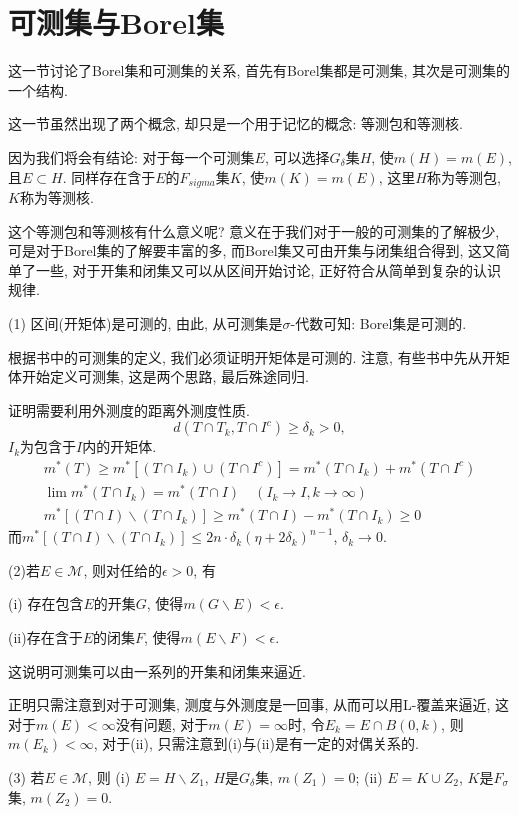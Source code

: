 \documentclass[12pt,a4paper,openany]{book}
\begin{document}
\section{可测集与Borel集}
这一节讨论了Borel集和可测集的关系, 首先有Borel集都是可测集, 其次是可测集的一个结构.

这一节虽然出现了两个概念, 却只是一个用于记忆的概念: 等测包和等测核.

因为我们将会有结论: 对于每一个可测集$E$, 可以选择$G_{\delta}$集$H$, 使$m(H) = m(E)$, 且$E \subset H$. 同样存在含于$E$的$F_{sigma}$集$K$, 使$m(K) = m(E)$, 这里$H$称为等测包, $K$称为等测核.

这个等测包和等测核有什么意义呢? 意义在于我们对于一般的可测集的了解极少, 可是对于Borel集的了解要丰富的多, 而Borel集又可由开集与闭集组合得到, 这又简单了一些, 对于开集和闭集又可以从区间开始讨论, 正好符合从简单到复杂的认识规律.

(1) 区间(开矩体)是可测的, 由此, 从可测集是$\sigma$-代数可知: Borel集是可测的.

根据书中的可测集的定义, 我们必须证明开矩体是可测的. 注意, 有些书中先从开矩体开始定义可测集, 这是两个思路, 最后殊途同归.

证明需要利用外测度的距离外测度性质.
\[
d(T \cap T_k, T \cap I^c) \ge \delta_k > 0,
\]
$I_k$为包含于$I$内的开矩体.
\begin{gather*}
m^*(T) \ge m^*[(T \cap I_k) \cup (T \cap I^c)] = m^*(T \cap I_k) + m^*(T \cap I^c) \\
\lim{m^*(T \cap I_k)} = m^*(T \cap I) \quad (I_k \rightarrow I, k \rightarrow \infty) \\
m^*[(T \cap I) \backslash (T \cap I_k)] \ge m^*(T \cap I) - m^*(T \cap I_k) \ge 0
\end{gather*}
而$m^*[(T \cap I) \backslash (T \cap I_k)] \le 2n\cdot \delta_k(\eta + 2\delta_k)^{n-1}$, $\delta_k \rightarrow 0$.

(2)若$E \in \mathcal{M}$, 则对任给的$\epsilon > 0$, 有

(i) 存在包含$E$的开集$G$, 使得$m(G \backslash E) < \epsilon$.

(ii)存在含于$E$的闭集$F$, 使得$m(E \backslash F) < \epsilon$.

这说明可测集可以由一系列的开集和闭集来逼近.

正明只需注意到对于可测集, 测度与外测度是一回事, 从而可以用L-覆盖来逼近, 这对于$m(E) < \infty$没有问题, 对于$m(E) = \infty$时, 令$E_k = E \cap B(0, k)$, 则$m(E_k) < \infty$, 对于(ii), 只需注意到(i)与(ii)是有一定的对偶关系的.

(3) 若$E \in \mathcal{M}$, 则
(i) $E = H \backslash Z_1$, $H$是$G_{\delta}$集, $m(Z_1) = 0$;
(ii) $E = K \cup Z_2$, $K$是$F_{\sigma}$集, $m(Z_2) = 0$.
\end{document}
